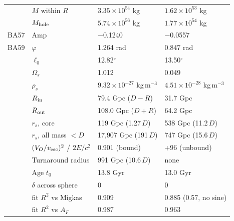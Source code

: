 \documentclass[10pt,letterpaper]{article}
\begin{document}
\begin{minipage}[t]{0.48\textwidth}
\begin{tabular}{llll}
 & $M$ within $R$ & $3.35\times10^{54}$ kg & $1.62\times10^{53}$ kg\\
 & $M_{\rm hole}$ & $5.74\times10^{56}$ kg & $1.77\times10^{54}$ kg\\
BA57 & Amp & $-$0.1240 & $-$0.0557\\
BA59 & $\varphi$ & 1.264 rad & 0.847 rad\\
 & $\ell_0$ & 12.82$^\circ$ & 13.50$^\circ$\\
\midrule
 & $\Omega_s$ & 1.012 & 0.049\\
 & $\rho_s$ & $9.32\times10^{-27}$ kg\,m$^{-3}$ & $4.51\times10^{-28}$ kg\,m$^{-3}$\\
 & $R_{\rm in}$ & 79.4 Gpc ($D-R$) & 31.7 Gpc\\
 & $R_{\rm out}$ & 108.0 Gpc ($D+R$) & 64.2 Gpc\\
 & $r_s$, core & 119 Gpc (1.27\,$D$) & 538 Gpc (11.2\,$D$)\\
 & $r_s$, all mass $<D$ & 17{,}907 Gpc (191\,$D$) & 747 Gpc (15.6\,$D$)\\
\midrule
 & $(V_O/v_{\rm esc})^2$ / $2E/c^2$ & 0.901 (bound) & +96 (unbound)\\
 & Turnaround radius & 991 Gpc (10.6\,$D$) & none\\
 & Age $t_0$ & 13.8 Gyr & 13.0 Gyr\\
 & $\delta$ across sphere & 0 & 0\\
 & fit $R^2$ vs Migkas & 0.909 & 0.885 (0.57, no sine)\\
 & fit $R^2$ vs $A_F$ & 0.987 & 0.963\\
\bottomrule
\end{tabular}
\end{minipage}
\par\vspace{6pt}
\end{document}
